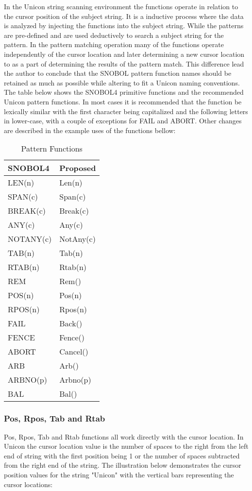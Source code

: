 \documentclass{article}
\begin{document}
In the Unicon string scanning environment the functions operate in relation to the cursor position of the subject string.  It is a inductive process where the data is analyzed by injecting the functions into the subject string.  While the patterns are pre-defined and are used deductively to search a subject string for the pattern.  In the pattern matching operation many of the functions operate independently of the cursor location and later determining a new cursor location to as a part of determining the results of the pattern match.  This difference lead the author to conclude that the SNOBOL pattern function names should be retained as much as possible while altering to fit a Unicon naming conventions.  The table below shows the SNOBOL4 primitive functions and the recommended Unicon pattern functions.  In most cases it is recommended that the function be lexically similar with the first character being capitalized and the following letters in lower-case, with a couple of exceptions for FAIL and ABORT.  Other changes are described in the example uses of the functions bellow: 

\begin{table}[ht]
	\caption{Pattern Functions}
	\centering
	\begin{tabular}{|l|l|}
		\hline\hline
		SNOBOL4 & Proposed \\
		\hline
		LEN(n) & Len(n) \\
		SPAN(c) & Span(c)  \\
		BREAK(c) & Break(c) \\
		ANY(c) & Any(c) \\
		NOTANY(c) & NotAny(c) \\
		TAB(n) & Tab(n) \\
		RTAB(n) & Rtab(n) \\
		REM & Rem() \\
		POS(n) & Pos(n)  \\
		RPOS(n) & Rpos(n)  \\
		FAIL & Back() \\
		FENCE & Fence() \\
		ABORT & Cancel() \\
		ARB & Arb() \\
		ARBNO(p) & Arbno(p) \\
		BAL & Bal() \\
		\hline
	\end{tabular}
\end{table}

\pagebreak
\vspace{2 pc}
\subsubsection{Pos, Rpos, Tab and Rtab}
Pos, Rpos, Tab and Rtab functions all work directly with the cursor location.  In Unicon the cursor location value is the number of spaces to the right from the left end of string with the first position being 1 or the number of spaces subtracted from the right end of the string.   The illustration below demonstrates the cursor position values for the string "Unicon" with the vertical bars representing the cursor locations:
\end{document}
